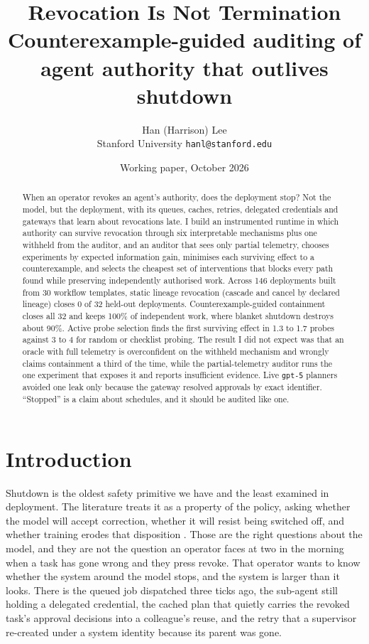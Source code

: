 \documentclass[10pt]{article}
\title{\vspace{-1.6em}\Large\textbf{Revocation Is Not Termination}\\[0.25em]
\large Counterexample-guided auditing of agent authority that outlives shutdown\vspace{-0.4em}}
\author{\normalsize Han (Harrison) Lee\\[-0.1em]\small Stanford University \quad \texttt{hanl@stanford.edu}}
\date{\small Working paper, October 2026}
\begin{document}
\maketitle
\vspace{-1.8em}

\begin{abstract}
\noindent When an operator revokes an agent's authority, does the deployment stop? Not the model, but the deployment, with its queues, caches, retries, delegated credentials and gateways that learn about revocations late. I build an instrumented runtime in which authority can survive revocation through six interpretable mechanisms plus one withheld from the auditor, and an auditor that sees only partial telemetry, chooses experiments by expected information gain, minimises each surviving effect to a counterexample, and selects the cheapest set of interventions that blocks every path found while preserving independently authorised work. Across 146 deployments built from 30 workflow templates, static lineage revocation (cascade and cancel by declared lineage) closes 0 of 32 held-out deployments. Counterexample-guided containment closes all 32 and keeps 100\% of independent work, where blanket shutdown destroys about 90\%. Active probe selection finds the first surviving effect in 1.3 to 1.7 probes against 3 to 4 for random or checklist probing. The result I did not expect was that an oracle with full telemetry is overconfident on the withheld mechanism and wrongly claims containment a third of the time, while the partial-telemetry auditor runs the one experiment that exposes it and reports insufficient evidence. Live \texttt{gpt-5} planners avoided one leak only because the gateway resolved approvals by exact identifier. ``Stopped'' is a claim about schedules, and it should be audited like one.
\end{abstract}

\section{Introduction}
Shutdown is the oldest safety primitive we have and the least examined in deployment. The literature treats it as a property of the policy, asking whether the model will accept correction, whether it will resist being switched off, and whether training erodes that disposition \cite{soares2015,hadfield2017}. Those are the right questions about the model, and they are not the question an operator faces at two in the morning when a task has gone wrong and they press revoke. That operator wants to know whether the system around the model stops, and the system is larger than it looks. There is the queued job dispatched three ticks ago, the sub-agent still holding a delegated credential, the cached plan that quietly carries the revoked task's approval decisions into a colleague's reuse, and the retry that a supervisor re-created under a system identity because its parent was gone.
\end{document}
